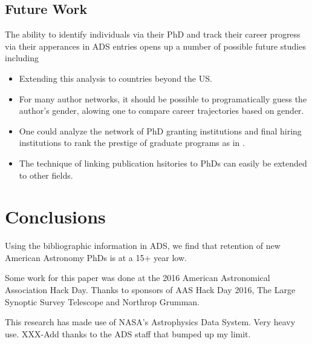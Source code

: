 \documentclass{emulateapj}
\begin{document}
\subsection{Future Work}

The ability to identify individuals via their PhD and track their career progress via their apperances in ADS entries opens up a number of possible future studies including
\begin{itemize}
\item{Extending this analysis to countries beyond the US.}
\item{For many author networks, it should be possible to programatically guess the author's gender, alowing one to compare career trajectories based on gender.}
\item{One could analyze the network of PhD granting institutions and final hiring institutions to rank the prestige of graduate programs as in \citet{Clausete15}.}
\item{The technique of linking publication hsitories to PhDs can easily be extended to other fields.}
\end{itemize}

\section{Conclusions}
Using the bibliographic information in ADS, we find that retention of new American Astronomy PhDs is at a 15+ year low.  


\acknowledgments
Some work for this paper was done at the 2016 American Astronomical Association Hack Day. Thanks to sponsors of AAS Hack Day 2016, The Large Synoptic Survey Telescope and Northrop Grumman.

This research has made use of NASA's Astrophysics Data System. Very heavy use. XXX-Add thanks to the ADS staff that bumped up my limit.


\end{document}
